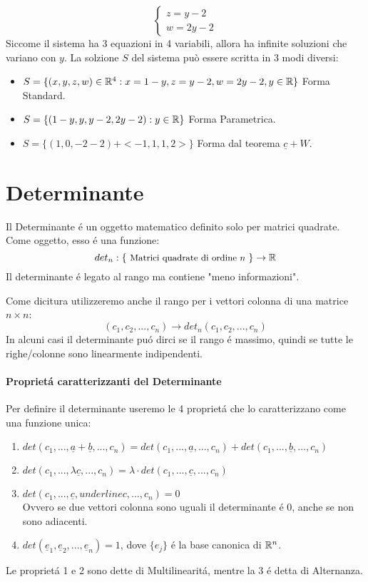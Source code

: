 {\begin{enumerate}
\[\begin{cases}
				      z=y-2 \\
				      w = 2y-2
			      \end{cases}
		      \]
		      Siccome il sistema ha 3 equazioni in 4 variabili, allora ha infinite soluzioni che variano con $y$.
		      La solzione $S$ del sistema può essere scritta in 3 modi diversi:
		      \begin{itemize}
			      \item $S=\{(x,y,z,w)\in \mathbb{R}^4 : x=1-y,z=y-2,w=2y-2, y\in \mathbb{R} \}$ Forma Standard.
			      \item $S=\{(1-y,y,y-2,2y-2):y\in\mathbb{R}\}$ Forma Parametrica.
			      \item $S=\{(1,0,-2-2)+<-1,1,1,2>\}$ Forma dal teorema $\underline{c} + W$.
		      \end{itemize}
	\end{enumerate}
}

\section{Determinante}
Il Determinante é un oggetto matematico definito solo per matrici quadrate.
Come oggetto, esso é una funzione:
\[
	det_n : \{\text{ \small{Matrici quadrate di ordine $n$} }	\} \to \mathbb{R}
\]
Il determinante é legato al rango ma contiene "meno informazioni".

Come dicitura utilizzeremo anche il rango per i vettori colonna di una matrice $n\times n$:
\[ (c_1,c_2, ... ,c_n) \to det_n(c_1,c_2,...,c_n)\]
In alcuni casi il determinante puó dirci se il rango é massimo, quindi se tutte le righe/colonne sono linearmente indipendenti.

\paragraph{Proprietá caratterizzanti del Determinante}
Per definire il determinante useremo le 4 proprietá che lo caratterizzano come una funzione unica:
\begin{enumerate}
	\item $det(c_1,...,\underline{a}+ \underline{b},...,c_n) = det(c_1,...,\underline{a},...,c_n) + det(c_1,...,\underline{b},...,c_n)$
	\item $det(c_1,...,\lambda \underline{c},...,c_n) = \lambda \cdot det(c_1,...,\underline{c},...,c_n)$
	\item $det(c_1,...,\underline{c}, underline{c},...,c_n) = 0$ \\
	      Ovvero se due vettori colonna sono uguali il determinante é 0, anche se non sono adiacenti.
	\item $det(\underline{e}_1, \underline{e}_2,...,\underline{e}_n) = 1$, dove $\{e_j\}$ é la base canonica di $\mathbb{R}^n$.

\end{enumerate}
Le proprietá 1 e 2 sono dette di Multilinearitá, mentre la 3 é detta di Alternanza.

